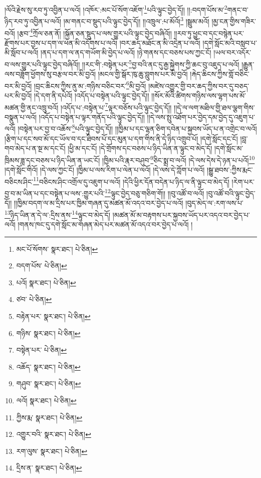 །ལོའི་རྗེས་སུ་རབ་ཏུ་འབྱིན་པ་ལའོ། །འཁོར་:མང་པོ་སོག་འཇོག་\footnote{མང་པོ་སོགས་  སྣར་ཐང་།  པེ་ཅིན། }པའི་ལྟུང་བྱེད་དོ།། །།:བདག་པོས་མ་\footnote{བདག་པོས་  པེ་ཅིན། }གནང་བ་ཉིད་རབ་ཏུ་འབྱིན་པ་ལའོ། །མ་གནང་བ་སྡུད་པའི་ལྟུང་བྱེད་དོ།། །།འཁྲུལ་:པ་མོའོ།\footnote{པའོ།  སྣར་ཐང་།  པེ་ཅིན། } །སྦྲུམ་མའོ། །མྱ་ངན་གྱིས་གཟིར་བའོ། །རྩབ་\footnote{ཙབ་  པེ་ཅིན། }ཀྲོལ་ཅན་ནོ། །སྐྱོན་ཅན་སྡུད་པ་ལས་གྱུར་པའི་ལྟུང་བྱེད་བཞིའོ།། །།རབ་ཏུ་ཕྱུང་བ་དང་བསྙེན་པར་རྫོགས་པར་བྱས་པ་དག་ལ་ཕན་མི་འདོགས་པ་ལའོ། །བར་ཆད་མཐོང་ན་མི་འདྲེན་པ་ལའོ། །དགེ་སློང་མའི་བསླབ་པ་མི་སློབ་པ་ལའོ། །ནད་པ་དག་ལ་ནད་གཡོག་མི་བྱེད་པ་ལའོ། །ཉེ་གནས་དང་བཅས་པས་ཀྱང་ངོ། །ཡལ་བར་འདོར་བ་ལས་གྱུར་པའི་ལྟུང་བྱེད་བཞིའོ།། །།རང་གི་:བསྟེན་པར་\footnote{བརྟེན་པར་  སྣར་ཐང་།  པེ་ཅིན། }བྱ་བའི་ནང་དུ་རྒྱ་སྐྱེགས་ཀྱི་ཆང་བུ་འཇུད་པ་ལའོ། །རྒྱུན་ལས་བཟློག་ཕྱོགས་སུ་བརྩལ་བར་མི་བྱའོ། །མངལ་གྱི་སྒོར་ཁུ་ཆུ་བླུགས་པར་མི་བྱའོ། །རྐེད་ཆིངས་ཀྱིས་གློ་བཅིང་བར་མི་བྱའོ། །བྲང་ཆིངས་ཀྱིས་ནུ་མ་:གཉིས་བཅིང་བར་\footnote{གཉིས་  སྣར་ཐང་།  པེ་ཅིན། }མི་བྱའོ། །མཛེས་འགྱུར་གྱི་བར་ཆད་ཀྱིས་བར་དུ་བཅད་པར་མི་བྱའོ། །དེ་དག་ནི་དཔེའོ། །འདོད་པ་བསྟེན་པའི་ལྟུང་བྱེད་དོ།། །།སོར་མོའི་ཚིགས་གཉིས་ལས་ལྷག་པས་མོ་མཚན་གྱི་ནང་འཁྲུ་བའོ། །འདོད་པ་:བསྟེན་པ་\footnote{བསྟེན་པར་  པེ་ཅིན། }ལྟར་བཅོས་པའི་ལྟུང་བྱེད་དོ།། །།དེ་ལ་ལག་མཐིལ་གྱི་ཐལ་ལྕག་གིས་བསྣུན་པ་ལའོ། །འདོད་པ་བསྟེན་པ་ལྟར་གནོད་པའི་ལྟུང་བྱེད་དོ།། །།དེ་ལས་སྤུ་འཐོག་པར་བྱེད་དམ་བྱེད་དུ་འཇུག་པ་ལའོ། །བསྟེན་པར་བྱ་བ་འཆོས་\footnote{འཆོད་  སྣར་ཐང་།  པེ་ཅིན། }པའི་ལྟུང་བྱེད་དོ།། །།ཁྱིམ་པ་དང་ལྷན་ཅིག་དབེན་པ་སྐྱབས་ཡོད་པ་ན་འགྲེང་བ་ལའོ། །རྩིག་པ་དང་སབ་མོ་དང་ཡོལ་བ་དང་ཐིབས་པོ་དང་མུན་པ་དག་གིས་ནི་དེ་ཉིད་འགྲུབ་པོ། །དགེ་སློང་དང་ངོ། །བླ་གབ་མེད་པ་ན་སྔ་མ་དང་ངོ། །ཕྱི་མ་དང་ངོ། །དེ་གྲོགས་དང་བཅས་པ་ཉིད་ཡིན་ན་ལྟུང་བ་མེད་དོ། །དགེ་སློང་མ་ཁྲིམས་ཟླ་དང་བཅས་པ་ཉིད་ཡིན་ན་ཡང་ངོ། །ཁྱིམ་པའི་རྣར་བཤུབ་\footnote{གཤུབ་  སྣར་ཐང་།  པེ་ཅིན། }ཅིང་སྨྲ་བ་ལའོ། །དེ་ལས་དེས་དེ་ཉན་པ་པའོ།\footnote{ལའོ།  སྣར་ཐང་།  པེ་ཅིན། } །དགེ་སློང་གིའོ། །དེ་ལས་ཀྱང་ངོ། །ཁྱིམ་པ་ལས་རིག་པ་ལེན་པ་ལའོ། །དེ་ལས་དེ་ཀློག་པ་ལའོ། །སྒྱུ་ཐབས་:ཀྱིས་རྨང་བཅིངས་ཤིང་\footnote{ཀྱིས་རྨ་  སྣར་ཐང་།  པེ་ཅིན། }བཅིངས་ཤིང་འགྲོལ་དུ་འཇུག་པ་ལའོ། །དེའི་ཕྱིར་དོན་བདེན་པ་ཉིད་ལ་ནི་ལྟུང་བ་མེད་དོ། །རེག་པར་བྱ་བ་མ་ཡིན་པ་དང་བསྟེན་པ་ལས་:གྱུར་པའི་\footnote{འགྱུར་བའི་  སྣར་ཐང་།  པེ་ཅིན། }ལྟུང་བྱེད་བཅུ་གཅིག་གོ།། །།བུ་འཚོ་བ་ལའོ། །བུ་འཚོ་བའི་ལྟུང་བྱེད་དོ།། །།ཁྱིམ་བདག་ལ་མ་དྲིས་པར་ཁྱིམ་གཞན་དུ་མཚན་མོ་འདའ་བར་བྱེད་པ་ལའོ། །བུད་མེད་ལ་:རག་ལས་པ་\footnote{རག་ལུས་  སྣར་ཐང་།  པེ་ཅིན། }ཉིད་ཡིན་ན་དེ་ལ་:དྲིས་ནས་\footnote{དྲིས་ན་  སྣར་ཐང་།  པེ་ཅིན། }ལྟུང་བ་མེད་དོ། །མཚན་མོ་མ་བརྟགས་པར་སྐྱབས་ཡོད་པར་འདའ་བར་བྱེད་པ་ལའོ། །གནས་ཁང་དུ་དགེ་སློང་མ་གཞན་མེད་པར་མཚན་མོ་འདའ་བར་བྱེད་པ་ལའོ། །

